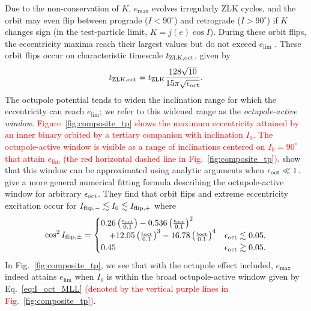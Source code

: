 \documentclass[
        fleqn,
        usenatbib,
    ]{mnras}
\newcommand*{\p}[1]{\left(#1\right)}
\begin{document}
Due to the non-conservation of $K$, $e_{\max}$ evolves irregularly ZLK cycles,
and the orbit may even flip between prograde ($I < 90^\circ$) and retrograde ($I
> 90^\circ$) if $K$ changes sign (in the test-particle limit, $K = j(e) \cos
I$). During these orbit flips, the eccentricity maxima reach their largest
values but do not exceed $e_{\lim}$ \citep{lithwick2011eccentric, LML15,
anderson2016formation}. These orbit flips occur on characteristic timescale
$t_{\rm ZLK, oct}$, given by \citep{antognini2015timescales}
\begin{equation}
    t_{\rm ZLK, oct} = t_{\rm ZLK}\frac{128\sqrt{10}}{
        15\pi\sqrt{\epsilon_{\rm oct}}}.\label{eq:def_tzlkoct}
\end{equation}
The octupole potential tends to widen the inclination range for which the
eccentricity can reach $e_{\lim}$; we refer to this widened range as the
\emph{octupole-active window}. \textcolor{red}{Figure~\ref{fig:composite_tp}
shows the maximum eccentricity attained by an inner binary orbited by a tertiary
companion with inclination $I_0$. The octupole-active window is visible as a
range of inclinations centered on $I_0 = 90^\circ$ that attain $e_{\lim}$ (the
red horizontal dashed line in Fig.~\ref{fig:composite_tp}).}
\citet{katz2011long} show that this window can be approximated using analytic
arguments when $\epsilon_{\rm oct} \ll 1$. \citet{MLL16} give a more general
numerical fitting formula describing the octupole-active window for arbitrary
$\epsilon_{\rm oct}$. They find that orbit flips and extreme eccentricity
excitation occur for $I_{\rm flip, -} \lesssim I_0 \lesssim I_{\rm flip, +}$
where
\begin{equation}
    \cos^2 I_{\rm flip, \pm} = \begin{cases}
        0.26\p{\frac{\epsilon_{\rm oct}}{0.1}}
            - 0.536\p{\frac{\epsilon_{\rm oct}}{0.1}}^2\\
            \quad + 12.05\p{\frac{\epsilon_{\rm oct}}{0.1}}^3
            - 16.78\p{\frac{\epsilon_{\rm oct}}{0.1}}^4
            & \epsilon_{\rm oct} \lesssim 0.05,\\
        0.45 & \epsilon_{\rm oct} \gtrsim 0.05.
    \end{cases} \label{eq:I_oct_MLL}
\end{equation}
In Fig.~\ref{fig:composite_tp}, we see that with the octupole effect included,
$e_{\max}$ indeed attains $e_{\lim}$ when $I_0$ is within the broad
octupole-active window given by Eq.~\eqref{eq:I_oct_MLL}
\textcolor{red}{(denoted by the vertical purple lines in
Fig.~\ref{fig:composite_tp})}.
\end{document}
